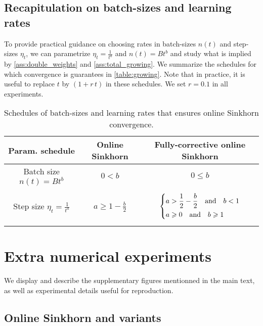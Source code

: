 \subsection{Recapitulation on batch-sizes and learning rates}

To provide practical guidance on choosing rates in batch-sizes $n(t)$ and
step-sizes $\eta_t$, we can parametrize $\eta_t = \frac{1}{t^a}$ and $n(t) = B
t^b$ and study what is implied by \autoref{ass:double_weights} and
\autoref{ass:total_growing}. We summarize the schedules for which convergence is
guarantees in \autoref{table:growing}. Note that in practice, it is useful to
replace $t$ by $(1 + r\, t)$ in these schedules. We set $r=0.1$ in all
experiments.

\begin{table}[t]
    \centering
    \caption{Schedules of batch-sizes and learning rates that ensures online Sinkhorn convergence.}

    \begin{tabular}{ccc}
        \toprule
        Param. schedule &Online Sinkhorn & Fully-corrective online Sinkhorn \\
        \midrule
        Batch size $\displaystyle n(t) = B t^b$ & $0 < b $ & $0 \leq b$ \\
        Step size $\displaystyle \eta_t = \frac{1}{t^a}$ &$\displaystyle a \geq 1 - \frac{b}{2}$ & 
        \parbox{5cm}{
        \begin{equation}
            \left\{
                \begin{aligned}
            a &> \frac{1}{2} - \frac{b}{2} \quad \text{and} \quad b <1 \\
            a &\geqslant 0 \quad \text{and} \quad b \geqslant 1
                \end{aligned}
                \right.
        \end{equation}}\\
        \bottomrule
    \end{tabular}
    \label{table:growing}
\end{table}
\vfill
\pagebreak

\section{Extra numerical experiments}

We display and describe the supplementary figures mentionned in the main text, as well as experimental details useful for reproduction.

\subsection{Online Sinkhorn and variants}\label{app:online_exp}

